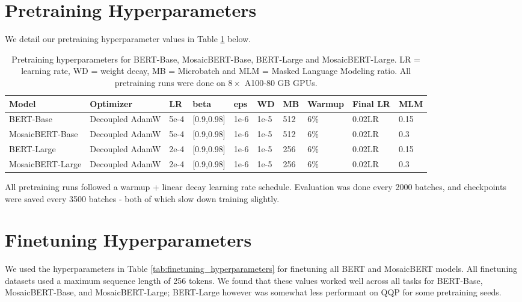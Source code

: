 
\section{Pretraining Hyperparameters} 

We detail our pretraining hyperparameter values in Table \ref{tab:pretrain_hyperparams} below.

\begin{table}[h]
\centering
\begin{tabular}{p{2cm} p{1.5cm} p{0.7cm} p{1.2cm} p{0.6cm} p{0.6cm} p{0.6cm} p{1cm} p{1.4cm} p{0.8cm} }\\

\toprule
Model & Optimizer & LR & beta & eps & WD & MB & Warmup & Final LR & MLM \\
\midrule
BERT-Base & Decoupled AdamW & 5e-4 & [0.9,0.98] & 1e-6 & 1e-5 & 512 & 6\% & 0.02LR & 0.15 \\
MosaicBERT-Base & Decoupled AdamW & 5e-4 & [0.9,0.98] & 1e-6 & 1e-5 & 512 & 6\% & 0.02LR  & 0.3 \\
BERT-Large & Decoupled AdamW & 2e-4 & [0.9,0.98] & 1e-6 & 1e-5 & 256 & 6\% & 0.02LR  & 0.15 \\
MosaicBERT-Large & Decoupled AdamW & 2e-4 & [0.9,0.98] & 1e-6 & 1e-5 & 256 & 6\% & 0.02LR & 0.3 \\
\bottomrule

\end{tabular}

\caption{Pretraining hyperparameters for BERT-Base, MosaicBERT-Base, BERT-Large and MosaicBERT-Large. LR = learning rate, WD = weight decay, MB = Microbatch and MLM = Masked Language Modeling ratio. All pretraining runs were done on $8\times$ A100-80 GB GPUs.}
\label{tab:pretrain_hyperparams}
\end{table}

All pretraining runs followed a warmup + linear decay learning rate schedule. Evaluation was done every 2000 batches, and checkpoints were saved every 3500 batches - both of which slow down training slightly.




\section{Finetuning Hyperparameters}

We used the hyperparameters in Table \ref{tab:finetuning_hyperparameters} for finetuning all BERT and MosaicBERT models.
All finetuning datasets used a maximum sequence length of 256 tokens. 
We found that these values worked well across all tasks for BERT-Base, MosaicBERT-Base, and MosaicBERT-Large; BERT-Large however was somewhat less performant on QQP for some pretraining seeds.


